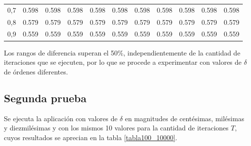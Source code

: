\begin{table}[H]
\begin{tabular}{crrrrrrrrrr}
0,7                          & 0.598                    & 0.598                    & 0.598                    & 0.598                    & 0.598                    & 0.598                    & 0.598                    & 0.598                    & 0.598                    & 0.598                     \\ 
0,8                          & 0.579                    & 0.579                    & 0.579                    & 0.579                    & 0.579                    & 0.579                    & 0.579                    & 0.579                    & 0.579                    & 0.579                     \\ 
0,9                          & 0.559                    & 0.559                    & 0.559                    & 0.559                    & 0.559                    & 0.559                    & 0.559                    & 0.559                    & 0.559                    & 0.559                     \\ \hline
\end{tabular}
\label{tabla10}
\end{table}
Los rangos de diferencia superan el 50\%, independientemente de la cantidad de iteraciones que se ejecuten, por lo que se procede a experimentar con valores de $\delta$ de órdenes diferentes. 

\subsection{Segunda prueba}

Se ejecuta la aplicación con valores de $\delta$ en magnitudes de centésimas, milésimas y diezmilésimas y con los mismos 10 valores para la cantidad de iteraciones $T$, cuyos resultados se aprecian en la tabla \ref{tabla100_10000}.

